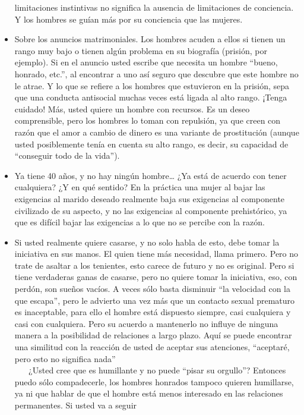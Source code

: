\begin{itemize}
  limitaciones instintivas no significa la ausencia de limitaciones de
  conciencia. Y los hombres se guían más por su conciencia que las
  mujeres.
\item
  Sobre los anuncios matrimoniales. Los hombres acuden a ellos si tienen
  un rango muy bajo o tienen algún problema en su biografía (prisión,
  por ejemplo). Si en el anuncio usted escribe que necesita un hombre
  ``bueno, honrado, etc.'', al encontrar a uno así seguro que descubre
  que este hombre no le atrae. Y lo que se refiere a los hombres que
  estuvieron en la prisión, sepa que una conducta antisocial muchas
  veces está ligada al alto rango. ¡Tenga cuidado! Más, usted quiere un
  hombre con recursos. Es un deseo comprensible, pero los hombres lo
  toman con repulsión, ya que creen con razón que el amor a cambio de
  dinero es una variante de prostitución (aunque usted posiblemente
  tenía en cuenta su alto rango, es decir, su capacidad de ``conseguir
  todo de la vida'').
\item
  Ya tiene 40 años, y no hay ningún hombre\ldots{} ¿Ya está de acuerdo
  con tener cualquiera? ¿Y en qué sentido? En la práctica una mujer al
  bajar las exigencias al marido deseado realmente baja sus exigencias
  al componente civilizado de su aspecto, y no las exigencias al
  componente prehistórico, ya que es difícil bajar las exigencias a lo
  que no se percibe con la razón.
\item
  Si usted realmente quiere casarse, y no solo habla de esto, debe tomar
  la iniciativa en sus manos. El quien tiene más necesidad, llama
  primero. Pero no trate de asaltar a los tenientes, esto carece de
  futuro y no es original. Pero si tiene verdaderas ganas de casarse,
  pero no quiere tomar la iniciativa, eso, con perdón, son sueños
  vacíos. A veces sólo basta disminuir ``la velocidad con la que
  escapa'', pero le advierto una vez más que un contacto sexual
  prematuro es inaceptable, para ello el hombre está dispuesto siempre,
  casi cualquiera y casi con cualquiera. Pero su acuerdo a mantenerlo no
  influye de ninguna manera a la posibilidad de relaciones a largo
  plazo. Aquí se puede encontrar una similitud con la reacción de usted
  de aceptar sus atenciones, ``aceptaré, pero esto no significa nada''\\
  \hspace*{0.333em} ~ ~ ¿Usted cree que es humillante y no puede ``pisar
  su orgullo''? Entonces puedo sólo compadecerle, los hombres honrados
  tampoco quieren humillarse, ya ni que hablar de que el hombre está
  menos interesado en las relaciones permanentes. Si usted va a seguir

\end{itemize}
